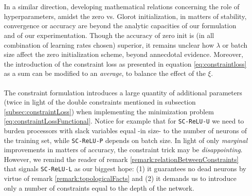 \\\\
In a similar direction, developing mathematical relations concerning the role of hyperparameters, amidst the zero vs. Glorot initialization, in matters of stability, convergence or accuracy are beyond the analytic capacities of our formulation and of our experimentation. Though the accuracy of zero init is (in all combination of learning rates chosen) superior, it remains unclear how $\lambda$ or batch size affect the zero initialization scheme, beyond annecdotal evidence. Moreover, the introduction of the constraint loss as presented in equation \ref{eq:constraintloss} as a sum can be modified to an \emph{average}, to balance the effect of the $\xi$.      
\\\\
The constraint formulation introduces a large quantity of additional parameters (twice in light of the double constraints mentioned in subsection \ref{subsec:constraintLoss}) when implementing the minimization problem \ref{eq:constraintLossFunctional}. Notice for example that for \texttt{SC-ReLU-U} we need to burden processors with slack variables equal -in size- to the number of neurons of the training set, while \texttt{SC-ReLU-P} depends on batch size. In light of only \emph{marginal} improvements in matters of accuracy, the constraint trick may be  \emph{disappointing}. However, we remind the reader of remark \ref{remark:relationBetweenConstraints} that signals \texttt{SC-ReLU-L} as our biggest hope: (1) it guarantees no dead neurons by virtue of remark \ref{remark:topologicalFacts} and (2) it demands us to introduce only a number of constraints equal to the depth of the network. 
  
